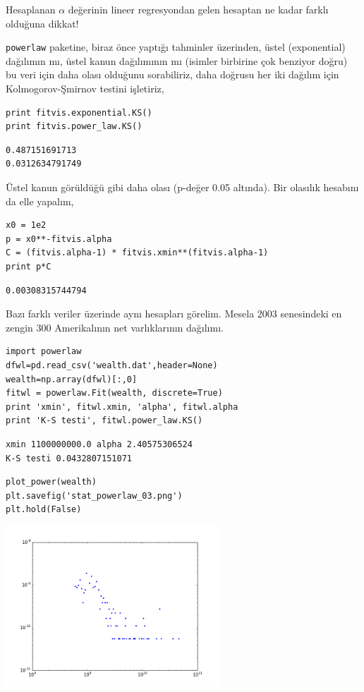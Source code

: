 \documentclass[12pt,fleqn]{article}\usepackage{../../common}
\begin{document}
Hesaplanan $\alpha$ değerinin lineer regresyondan gelen hesaptan ne kadar
farklı olduğuna dikkat! 

\verb!powerlaw! paketine, biraz önce yaptığı tahminler üzerinden, üstel
(exponential) dağılımın mı, üstel kanun dağılımının mı (isimler birbirine
çok benziyor doğru) bu veri için daha olası olduğunu sorabiliriz, daha
doğrusu her iki dağılım için Kolmogorov-Şmirnov testini işletiriz,

\begin{verbatim}
print fitvis.exponential.KS()
print fitvis.power_law.KS()
\end{verbatim}

\begin{verbatim}
0.487151691713
0.0312634791749
\end{verbatim}

Üstel kanun görüldüğü gibi daha olası (p-değer 0.05 altında). Bir olasılık
hesabını da elle yapalım,

\begin{verbatim}
x0 = 1e2
p = x0**-fitvis.alpha
C = (fitvis.alpha-1) * fitvis.xmin**(fitvis.alpha-1)
print p*C
\end{verbatim}

\begin{verbatim}
0.00308315744794
\end{verbatim}

Bazı farklı veriler üzerinde aynı hesapları görelim. Mesela 2003
senesindeki en zengin 300 Amerikalının net varlıklarının dağılımı. 

\begin{verbatim}
import powerlaw
dfwl=pd.read_csv('wealth.dat',header=None)
wealth=np.array(dfwl)[:,0]
fitwl = powerlaw.Fit(wealth, discrete=True)
print 'xmin', fitwl.xmin, 'alpha', fitwl.alpha
print 'K-S testi', fitwl.power_law.KS()
\end{verbatim}

\begin{verbatim}
xmin 1100000000.0 alpha 2.40575306524
K-S testi 0.0432807151071
\end{verbatim}

\begin{verbatim}
plot_power(wealth)
plt.savefig('stat_powerlaw_03.png')
plt.hold(False)
\end{verbatim}

\includegraphics[height=6cm]{stat_powerlaw_03.png}
\end{document}
